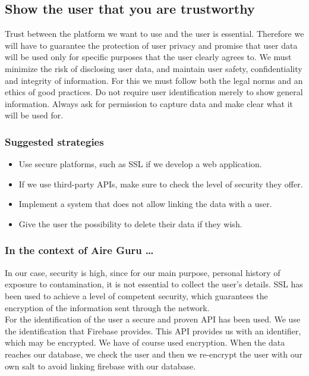 \subsection{Show the user that you are trustworthy}

Trust between the platform we want to use and the user is essential.
Therefore we will have to guarantee the protection of user privacy and promise that user data will be used only for specific purposes that the user clearly agrees to.
We must minimize the risk of disclosing user data, and maintain user safety, confidentiality and integrity of information.
For this we must follow both the legal norms and an ethics of good practices.
Do not require user identification merely to show general information.
Always ask for permission to capture data and make clear what it will be used for.

\subsubsection*{Suggested strategies} 

\begin{itemize}
    \item Use secure platforms, such as SSL if we develop a web application.
    \item If we use third-party APIs, make sure to check the level of security they offer.
    \item Implement a system that does not allow linking the data with a user.
    \item Give the user the possibility to delete their data if they wish.
\end{itemize}

\subsubsection*{In the context of Aire Guru \ldots} 

In our case, security is high, since for our main purpose, personal history
of exposure to contamination, it is not essential to collect the user's details.
SSL has been used to achieve a level of competent security, which guarantees the encryption of
the information sent through the network.\\

For the identification of the user a secure and proven API has been used. We use the identification
that Firebase provides. This API provides us with an identifier, which may be encrypted.
We have of course used encryption. When the data reaches our database,
we check the user and then we re-encrypt the user with our own salt to
avoid linking firebase with our database.\\

